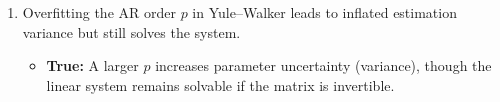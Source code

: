 \documentclass{article}
\begin{document}
\begin{enumerate}
  \item Overfitting the AR order $p$ in Yule–Walker leads to inflated estimation variance but still solves the system.
  \begin{itemize}
    \item \textbf{True:} A larger $p$ increases parameter uncertainty (variance), though the linear system remains solvable if the matrix is invertible.
  \end{itemize}
\end{enumerate}


\pagebreak

\end{document}

